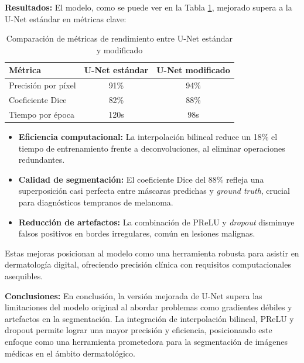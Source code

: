 \textbf{Resultados:}
El modelo, como se puede ver en la Tabla \ref{tab:unet_comparison}, mejorado supera a la U-Net estándar en métricas clave:

\begin{table}[H]
    \centering
    \caption{Comparación de métricas de rendimiento entre U-Net estándar y modificado}
    \renewcommand{\arraystretch}{1.2}
    \setlength{\tabcolsep}{10pt}
    \begin{tabular}{lcc}
        \toprule
        Métrica & U-Net estándar & U-Net modificado \\
        \midrule
        Precisión por píxel & 91\% & 94\% \\
        Coeficiente Dice & 82\% & 88\% \\
        Tiempo por época & 120s & 98s \\
        \bottomrule
    \end{tabular}
    \label{tab:unet_comparison}
\end{table}

\begin{itemize}
    \item \textbf{Eficiencia computacional:} La interpolación bilineal reduce un 18\% el tiempo de entrenamiento frente a deconvoluciones, al eliminar operaciones redundantes.


	\item \textbf{Calidad de segmentación:} El coeficiente Dice del 88\% refleja una superposición casi perfecta entre máscaras predichas y \textit{ground truth}, crucial para diagnósticos tempranos de melanoma.

	\item \textbf{Reducción de artefactos:} La combinación de PReLU y \textit{dropout} disminuye falsos positivos en bordes irregulares, común en lesiones malignas.

\end{itemize}

Estas mejoras posicionan al modelo como una herramienta robusta para asistir en dermatología digital, ofreciendo precisión clínica con requisitos computacionales asequibles.


\textbf{Conclusiones:}
En conclusión, la versión mejorada de U-Net supera las limitaciones del modelo original al abordar problemas como gradientes débiles y artefactos en la segmentación. La integración de interpolación bilineal, PReLU y dropout permite lograr una mayor precisión y eficiencia, posicionando este enfoque como una herramienta prometedora para la segmentación de imágenes médicas en el ámbito dermatológico.

